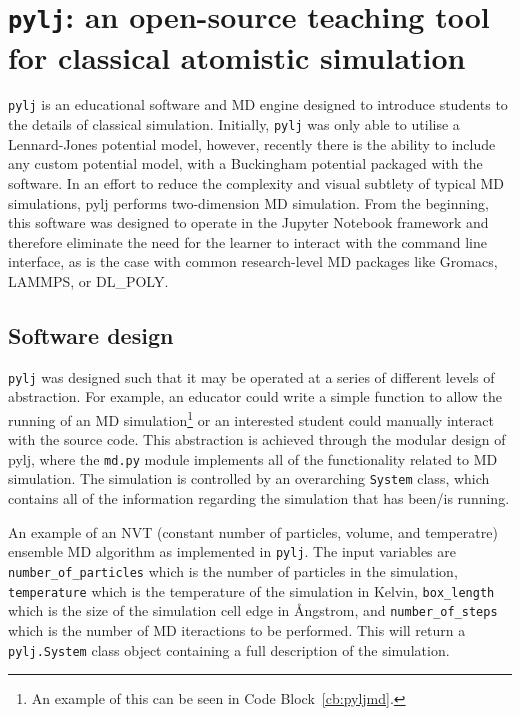 \section{\texttt{pylj}: an open-source teaching tool for classical atomistic simulation}

\texttt{pylj} is an educational software and MD engine designed to introduce students to the details of classical simulation.
Initially, \texttt{pylj} was only able to utilise a Lennard-Jones potential model, however, recently there is the ability to include any custom potential model, with a Buckingham potential packaged with the software.
In an effort to reduce the complexity and visual subtlety of typical MD simulations, pylj performs two-dimension MD simulation.
From the beginning, this software was designed to operate in the Jupyter Notebook framework and therefore eliminate the need for the learner to interact with the command line interface, as is the case with common research-level MD packages like Gromacs, LAMMPS, or DL\_POLY.

\subsection{Software design}
\texttt{pylj} was designed such that it may be operated at a series of different levels of abstraction.
For example, an educator could write a simple function to allow the running of an MD simulation\footnote{An example of this can be seen in Code Block~\ref{cb:pyljmd}.} or an interested student could manually interact with the source code.
This abstraction is achieved through the modular design of pylj, where the \texttt{md.py} module implements all of the functionality related to MD simulation.
The simulation is controlled by an overarching \texttt{System} class, which contains all of the information regarding the simulation that has been/is running.
%
\begin{listing}[t]
    \centering
    \caption{An example of an NVT (constant number of particles, volume, and temperatre) ensemble MD algorithm as implemented in \texttt{pylj}. The input variables are \texttt{number\_of\_particles} which is the number of particles in the simulation, \texttt{temperature} which is the temperature of the simulation in Kelvin, \texttt{box\_length} which is the size of the simulation cell edge in \AA ngstrom, and \texttt{number\_of\_steps} which is the number of MD iteractions to be performed. This will return a \texttt{pylj.System} class object containing a full description of the simulation.}
    
    \label{cb:pyljmd}
\end{listing}
%

